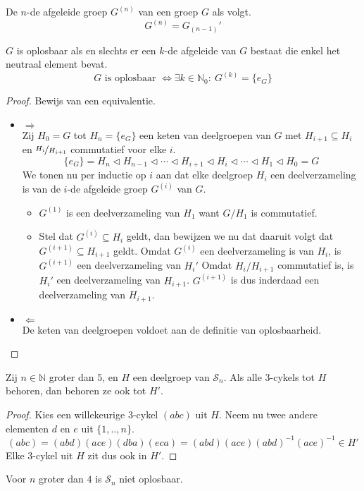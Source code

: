 \documentclass[main.tex]{subfiles}
\begin{document}
\begin{de}
  De $n$-de afgeleide groep $G^{(n)}$ van een groep $G$ als volgt.
  \[ G^{(n)} = G_{(n-1)}' \]
\end{de}

\begin{pr}
  $G$ is oplosbaar als en slechts er een $k$-de afgeleide van $G$ bestaat die enkel het neutraal element bevat.
  \[ G \text{ is oplosbaar } \Leftrightarrow \exists k\in\mathbb{N}_{0}:\ G^{(k)} = \{e_{G}\} \]

  \begin{proof}
    Bewijs van een equivalentie.
    \begin{itemize}
    \item $\Rightarrow$\\
       Zij $H_{0}=G$ tot $H_{n} = \{e_{G}\}$ een keten van deelgroepen van $G$ met $H_{i+1} \subseteq H_{i}$ en $\nicefrac{H_{i}}{H_{i+1}}$ commutatief voor elke $i$.
       \[ \{ e_{G} \} = H_{n} \triangleleft H_{n-1} \triangleleft \dotsb \triangleleft H_{i+1} \triangleleft H_{i} \triangleleft \dotsb \triangleleft H_{1} \triangleleft H_{0} = G \]
       We tonen nu per inductie op $i$ aan dat elke deelgroep $H_{i}$ een deelverzameling is van de $i$-de afgeleide groep $G^{(i)}$ van $G$.
       \begin{itemize}
       \item $G^{(1)}$ is een deelverzameling van $H_{1}$ want $G/H_{1}$ is commutatief.
\waarom
       \item Stel dat $G^{(i)} \subseteq H_{i}$ geldt, dan bewijzen we nu dat daaruit volgt dat $G^{(i+1)} \subseteq H_{i+1}$ geldt.
         Omdat $G^{(i)}$ een deelverzameling is van $H_{i}$, is $G^{(i+1)}$ een deelverzameling van $H_{i}'$
\waarom
         Omdat $H_{i}/H_{i+1}$ commutatief is, is $H_{i}'$ een deelverzameling van $H_{i+1}$.
\waarom
         $G^{(i+1)}$ is dus inderdaad een deelverzameling van $H_{i+1}$.
       \end{itemize}
    \item $\Leftarrow$\\
      De keten van deelgroepen voldoet aan de definitie van oplosbaarheid.  
    \end{itemize}
  \end{proof}
\end{pr}

\begin{lem}
  Zij $n\in \mathbb{N}$ groter dan $5$, en $H$ een deelgroep van $\mathcal{S}_{n}$.
  Als alle $3$-cykels tot $H$ behoren, dan behoren ze ook tot $H'$.

  \begin{proof}
    Kies een willekeurige $3$-cykel $(abc)$ uit $H$.
    Neem nu twee andere elementen $d$ en $e$ uit $\{1,..,n\}$.
    \[ (abc) = (abd)(ace)(dba)(eca) = (abd)(ace)(abd)^{-1}(ace)^{-1} \in H' \]
    Elke $3$-cykel uit $H$ zit dus ook in $H'$.
  \end{proof}
\end{lem}

\begin{st}
  Voor $n$ groter dan $4$ is $\mathcal{S}_{n}$ niet oplosbaar.
\end{st}
\end{document}
